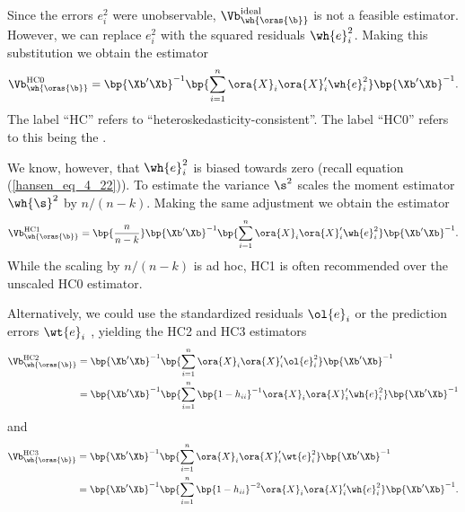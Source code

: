 Since the errors $e_i^2$ were unobservable, $\Vb_{\wh{\oras{\b}}}^{\text{ideal}}$ is not a feasible estimator. However, we can replace $e_i^2$ with the squared residuals $\wh{e}_i^2$. Making this substitution we obtain the estimator
\begin{equation}
    \label{hansen_eq_4_31}
    \Vb_{\wh{\oras{\b}}}^{\text{HC0}} = \bp{\Xb^\prime \Xb}^{-1} \bp{\sum_{i=1}^n \ora{X}_i \ora{X}_i^\prime \wh{e}_i^2} \bp{\Xb^\prime \Xb}^{-1} .
\end{equation}
The label ``HC'' refers to ``heteroskedasticity-consistent''. The label ``HC0'' refers to this being the .

We know, however, that $\wh{e}_i^2$ is biased towards zero (recall equation (\ref{hansen_eq_4_22})). To estimate the variance $\s^2$ scales the moment estimator $\wh{\s}^2$ by $n/(n-k)$. Making the same adjustment we obtain the estimator 
\begin{equation}
    \label{hansen_eq_4_32}
    \Vb_{\wh{\oras{\b}}}^{\text{HC1}} = \bp{\frac{n}{n-k}} \bp{\Xb^\prime \Xb}^{-1} \bp{\sum_{i=1}^n \ora{X}_i \ora{X}_i^\prime \wh{e}_i^2} \bp{\Xb^\prime \Xb}^{-1} .
\end{equation}
While the scaling by $n/(n-k)$ is ad hoc, HC1 is often recommended over the unscaled HC0 estimator.

Alternatively, we could use the standardized residuals $\ol{e}_i$ or the prediction errors $\wt{e}_i$ , yielding the HC2 and HC3 estimators
\begin{equation}
    \label{hansen_eq_4_33}
    \begin{aligned}
        \Vb_{\wh{\oras{\b}}}^{\text{HC2}} & = \bp{\Xb^\prime \Xb}^{-1} \bp{\sum_{i=1}^n \ora{X}_i \ora{X}_i^\prime \ol{e}_i^2} \bp{\Xb^\prime \Xb}^{-1} \\
        & = \bp{\Xb^\prime \Xb}^{-1} \bp{\sum_{i=1}^n \bp{1-h_{ii}}^{-1} \ora{X}_i \ora{X}_i^\prime \wh{e}_i^2} \bp{\Xb^\prime \Xb}^{-1}
    \end{aligned}
\end{equation}
and 
\begin{equation}
    \label{hansen_eq_4_34}
    \begin{aligned}
        \Vb_{\wh{\oras{\b}}}^{\text{HC3}} & = \bp{\Xb^\prime \Xb}^{-1} \bp{\sum_{i=1}^n \ora{X}_i \ora{X}_i^\prime \wt{e}_i^2} \bp{\Xb^\prime \Xb}^{-1} \\
        & = \bp{\Xb^\prime \Xb}^{-1} \bp{\sum_{i=1}^n \bp{1-h_{ii}}^{-2} \ora{X}_i \ora{X}_i^\prime \wh{e}_i^2} \bp{\Xb^\prime \Xb}^{-1} .
    \end{aligned}
\end{equation}

